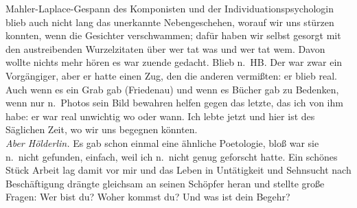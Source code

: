 \documentclass[
]{article}
\begin{document}
Mahler-Laplace-Gespann des Komponisten und der Individuationspsychologin
blieb auch nicht lang das unerkannte Nebengeschehen, worauf wir uns
stürzen konnten, wenn die Gesichter verschwammen; dafür haben wir selbst
gesorgt mit den austreibenden Wurzelzitaten über wer tat was und wer tat
wem. Davon wollte nichts mehr hören es war zuende gedacht. Blieb n.~HB.
Der war zwar ein Vorgängiger, aber er hatte einen Zug, den die anderen
vermißten: er blieb real. Auch wenn es ein Grab gab (Friedenau) und wenn
es Bücher gab zu Bedenken, wenn nur n.~Photos sein Bild bewahren helfen
gegen das letzte, das ich von ihm habe: er war real unwichtig wo oder
wann. Ich lebte jetzt und hier ist des Säglichen Zeit, wo wir uns
begegnen könnten.\\
\emph{Aber Hölderlin.} Es gab schon einmal eine ähnliche Poetologie,
bloß war sie n.~nicht gefunden, einfach, weil ich n.~nicht genug
geforscht hatte. Ein schönes Stück Arbeit lag damit vor mir und das
Leben in Untätigkeit und Sehnsucht nach Beschäftigung drängte gleichsam
an seinen Schöpfer heran und stellte große Fragen: Wer bist du? Woher
kommst du? Und was ist dein Begehr?
\end{document}
